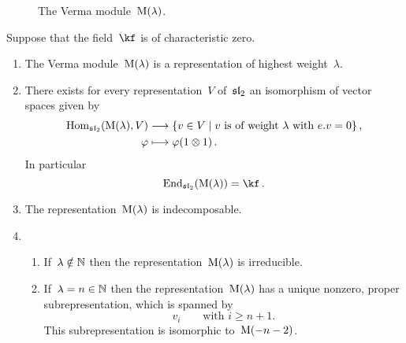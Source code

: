 \documentclass[a4paper, 11pt, oneside]{scrartcl}
\begin{document}
\begin{proposition}
\begin{enumerate}
\begin{figure}
\begin{center}
        \end{center}
        \caption{The Verma module~$\operatorname{M}(\lambda)$.}
        \label{graphical representation of verma module}
      \end{figure}
  \end{enumerate}
  Suppose that the field~$\kf$ is of characteristic zero.
  \begin{enumerate}[resume*]
    \item
      The Verma module~$\operatorname{M}(\lambda)$ is a representation of highest weight~$\lambda$.
    \item
      There exists for every representation~$V$ of~$\mathfrak{sl}_2$ an isomorphism of vector spaces given by
      \begin{align*}
        \Hom_{\sllie_2}( \verma(\lambda), V )
        &\longto
        \{
          v \in V
        \suchthat
          \text{$v$ is of weight~$\lambda$ with~$e.v = 0$}
        \} \,,
        \\
        \varphi
        &\longmapsto
        \varphi(1 \tensor 1) \,.
      \end{align*}
      In particular
      \[
        \End_{\sllie_2}( \verma(\lambda) )
        =
        \kf \,.
      \]
    \item
      The representation~$\operatorname{M}(\lambda)$ is indecomposable.
    \item
      \begin{enumerate}
        \item
          If~$\lambda \notin \mathbb{N}$ then the representation~$\operatorname{M}(\lambda)$ is irreducible.
        \item
          If~$\lambda = n \in \mathbb{N}$ then the representation~$\operatorname{M}(\lambda)$ has a unique nonzero, proper subrepresentation, which is spanned by
          \[
            v_i
            \qquad
            \text{with~$i \geq n+1$.}
          \]
          This subrepresentation is isomorphic to~$\operatorname{M}(-n-2)$.
      \end{enumerate}
  \end{enumerate}
\end{proposition}
\end{document}
